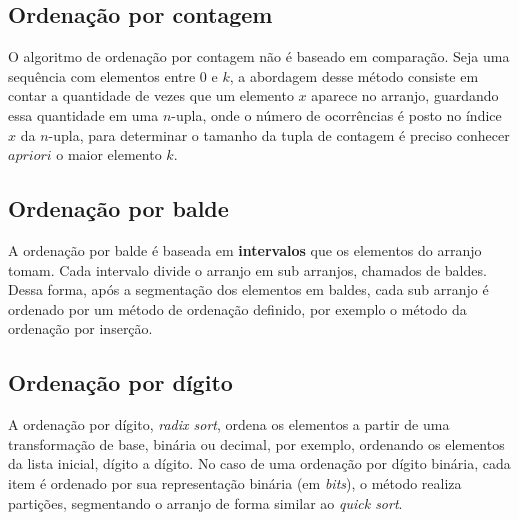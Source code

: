 \subsection{Ordenação por contagem}

O algoritmo de ordenação por contagem não é baseado em comparação. Seja uma sequência com elementos entre $0$ e $k$, a abordagem desse método consiste em contar a quantidade de vezes que um elemento $x$ aparece no arranjo, guardando essa quantidade em uma $n$-upla, onde o número de ocorrências é posto no índice $x$ da $n$-upla, para determinar o tamanho da tupla de contagem é preciso conhecer $a priori$ o maior elemento $k$.

\subsection{Ordenação por balde}

A ordenação por balde é baseada em \textbf{intervalos} que os elementos do arranjo tomam. Cada intervalo divide o arranjo em sub arranjos, chamados de baldes. Dessa forma, após a segmentação dos elementos em baldes, cada sub arranjo é ordenado por um método de ordenação definido, por exemplo o método da ordenação por inserção.

\subsection{Ordenação por dígito}

A ordenação por dígito, \textit{radix sort}, ordena os elementos a partir de uma transformação de base, binária ou decimal, por exemplo, ordenando os elementos da lista inicial, dígito a dígito. No caso de uma ordenação por dígito binária, cada item é ordenado por sua representação binária (em \textit{bits}), o método realiza partições, segmentando o arranjo de forma similar ao \textit{quick sort}.
